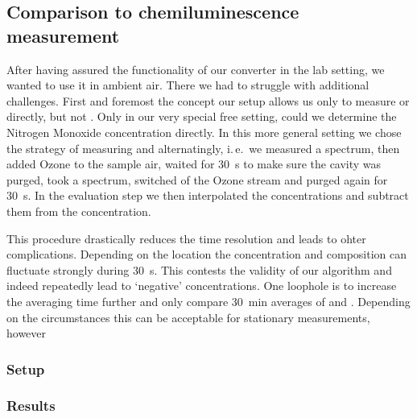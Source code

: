 \subsection{Comparison to chemiluminescence measurement}
\label{sec:cld}

After having assured the functionality of our converter in the lab
setting, we wanted to use it in ambient air. There we had to struggle
with additional challenges. First and foremost the concept our setup
allows us only to measure  or  directly, but not
. Only in our very special  free setting, could we
determine the Nitrogen Monoxide concentration directly. In this more
general setting we chose the strategy of measuring  and
 alternatingly, i.\,e.\ we measured a  spectrum, then
added Ozone to the sample air, waited for \SI{30}{\second} to make
sure the cavity was purged, took a  spectrum, switched of the
Ozone stream and purged again for \SI{30}{\second}. In the evaluation
step we then interpolated the  concentrations and subtract
them from the  concentration. 

This procedure drastically reduces the time resolution and leads to
ohter complications. Depending on the location the 
concentration and composition can fluctuate strongly during
\SI{30}{\second}. This contests the validity of our algorithm and
indeed repeatedly lead to `negative'  concentrations. One
loophole is to increase the averaging time further and only compare
\SI{30}{\minute} averages of  and . Depending on the
circumstances this can be acceptable for stationary measurements, however


\subsubsection{Setup}
\label{sec:cld-setup}

\subsubsection{Results}
\label{sec:cld-results}




